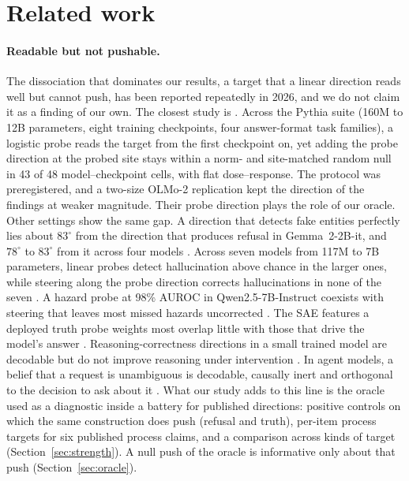 \documentclass[11pt]{article}
\begin{document}
\section{Related work}\label{sec:related}

\paragraph{Readable but not pushable.} The dissociation that dominates our results, a target that a linear direction reads well but cannot push, has been reported repeatedly in 2026, and we do not claim it as a finding of our own. The closest study is \citet{xun2026lagged}. Across the Pythia suite (160M to 12B parameters, eight training checkpoints, four answer-format task families), a logistic probe reads the target from the first checkpoint on, yet adding the probe direction at the probed site stays within a norm- and site-matched random null in 43 of 48 model--checkpoint cells, with flat dose--response. The protocol was preregistered, and a two-size OLMo-2 replication kept the direction of the findings at weaker magnitude. Their probe direction plays the role of our oracle. Other settings show the same gap. A direction that detects fake entities perfectly lies about $83^\circ$ from the direction that produces refusal in Gemma~2-2B-it, and $78^\circ$ to $83^\circ$ from it across four models \citep{galeone2026detection}. Across seven models from 117M to 7B parameters, linear probes detect hallucination above chance in the larger ones, while steering along the probe direction corrects hallucinations in none of the seven \citep{roy2026detection}. A hazard probe at 98\% AUROC in Qwen2.5-7B-Instruct coexists with steering that leaves most missed hazards uncorrected \citep{basu2026actionability}. The SAE features a deployed truth probe weights most overlap little with those that drive the model's answer \citep{tiwari2026decodability}. Reasoning-correctness directions in a small trained model are decodable but do not improve reasoning under intervention \citep{nwadike2026correctness}. In agent models, a belief that a request is unambiguous is decodable, causally inert and orthogonal to the decision to ask about it \citep{zavattari2026interventions}. What our study adds to this line is the oracle used as a diagnostic inside a battery for published directions: positive controls on which the same construction does push (refusal and truth), per-item process targets for six published process claims, and a comparison across kinds of target (Section~\ref{sec:strength}). A null push of the oracle is informative only about that push (Section~\ref{sec:oracle}).
\end{document}
